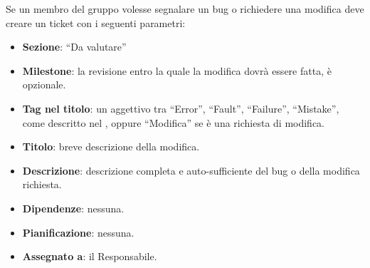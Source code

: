 Se un membro del gruppo volesse segnalare un bug o richiedere una modifica deve creare un ticket con i seguenti parametri:
\begin{itemize}
 \item \textbf{Sezione}: ``Da valutare''
 \item \textbf{Milestone}: la revisione entro la quale la modifica dovrà essere fatta, è opzionale.
 \item \textbf{Tag nel titolo}: un aggettivo tra ``Error'', ``Fault'', ``Failure'', ``Mistake'', come descritto nel \PianoDiQualifica, oppure ``Modifica'' se è una richiesta di modifica.
 \item \textbf{Titolo}: breve descrizione della modifica.
 \item \textbf{Descrizione}: descrizione completa e auto-sufficiente del bug o della modifica richiesta.
 \item \textbf{Dipendenze}: nessuna.
 \item \textbf{Pianificazione}: nessuna.
 \item \textbf{Assegnato a}: il Responsabile.
\end{itemize}
